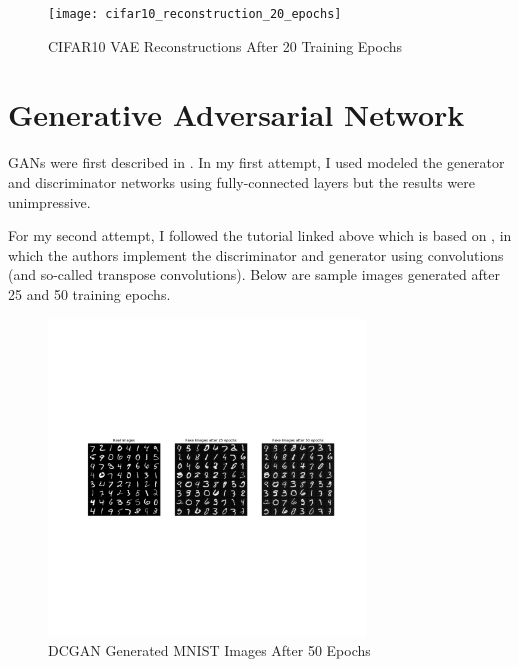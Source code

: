 \documentclass[letterpaper, 10pt]{article}
\begin{document}
\begin{figure}[h]
\caption{CIFAR10 VAE Reconstructions After 20 Training Epochs}
\centering
\texttt{[image: cifar10\_reconstruction\_20\_epochs]}
\end{figure}

\section{Generative Adversarial Network}

GANs were first described in \cite{goodfellow2014generative}. 
In my first attempt, I used modeled the generator and discriminator networks using fully-connected layers but the results were unimpressive.

For my second attempt, I followed the tutorial linked above which is based on \cite{radford2015unsupervised},
in which the authors implement the discriminator and generator using convolutions (and so-called transpose convolutions).
Below are sample images generated after 25 and 50 training epochs.

\begin{figure}[h]
\caption{DCGAN Generated MNIST Images After 50 Epochs}
\centering
\includegraphics[width=0.75\textwidth]{mnist_gan_real_v_fake_50_epochs}
\end{figure}
\end{document}
